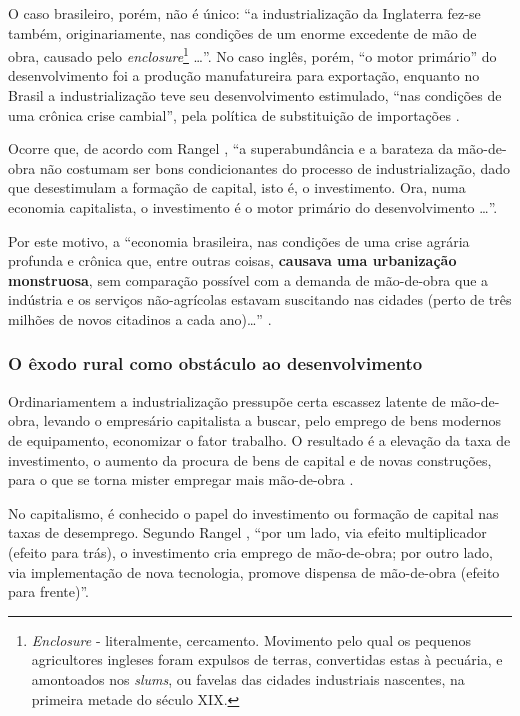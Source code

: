 \documentclass[
	12pt,				%
	oneside,			%
	a4paper,			%
	chapter=TITLE,		%
	section=TITLE,		%
	english,			%
	brazil				%
	]{abntex2}
\begin{document}
\begin{refsection}
O caso brasileiro, porém, não é único: ``a industrialização da Inglaterra fez-se
também, originariamente, nas condições de um enorme excedente de mão de obra,
causado pelo \emph{enclosure}\footnote{\emph{Enclosure} - literalmente, cercamento. Movimento pelo qual os pequenos
  agricultores ingleses foram expulsos de terras, convertidas estas à pecuária, e
  amontoados nos \emph{slums}, ou favelas das cidades industriais nascentes, na
  primeira metade do século XIX.} \ldots{}''. No caso inglês, porém, ``o motor primário'' do
desenvolvimento foi a produção manufatureira para exportação, enquanto no Brasil
a industrialização teve seu desenvolvimento estimulado, ``nas condições de uma
crônica crise cambial'', pela política de substituição de importações
\autocite[43-44]{rangel1962}.

Ocorre que, de acordo com Rangel \autocite*[134]{rangel1986b}, ``a superabundância e a
barateza da mão-de-obra não costumam ser bons condicionantes do processo de
industrialização, dado que desestimulam a formação de capital, isto é, o
investimento. Ora, numa economia capitalista, o investimento é o motor primário
do desenvolvimento \ldots{}''.

Por este motivo, a ``economia brasileira, nas condições de uma crise agrária
profunda e crônica que, entre outras coisas, \textbf{causava uma urbanização
monstruosa}, sem comparação possível com a demanda de mão-de-obra que a
indústria e os serviços não-agrícolas estavam suscitando nas cidades (perto de
três milhões de novos citadinos a cada ano)\ldots{}'' \autocite[134]{rangel1986b}.

\hypertarget{o-uxeaxodo-rural-como-obstuxe1culo-ao-desenvolvimento}{%
\subsubsection{O êxodo rural como obstáculo ao desenvolvimento}\label{o-uxeaxodo-rural-como-obstuxe1culo-ao-desenvolvimento}}
\begin{citacao}
Ordinariamentem a industrialização pressupõe certa escassez latente de 
mão-de-obra, levando o empresário capitalista a buscar, pelo emprego de bens
modernos de equipamento, economizar o fator trabalho. O resultado é a elevação 
da taxa de investimento, o aumento da procura de bens de capital e de novas
construções, para o que se torna mister empregar mais mão-de-obra 
\cite[p.~43]{rangel1962}.
\end{citacao}
No capitalismo, é conhecido o papel do investimento ou formação de capital nas
taxas de desemprego. Segundo Rangel \autocite*[156]{rangel1988}, ``por um lado, via
efeito multiplicador (efeito para trás), o investimento cria emprego de
mão-de-obra; por outro lado, via implementação de nova tecnologia, promove
dispensa de mão-de-obra (efeito para frente)''.


\end{refsection}
\end{document}
